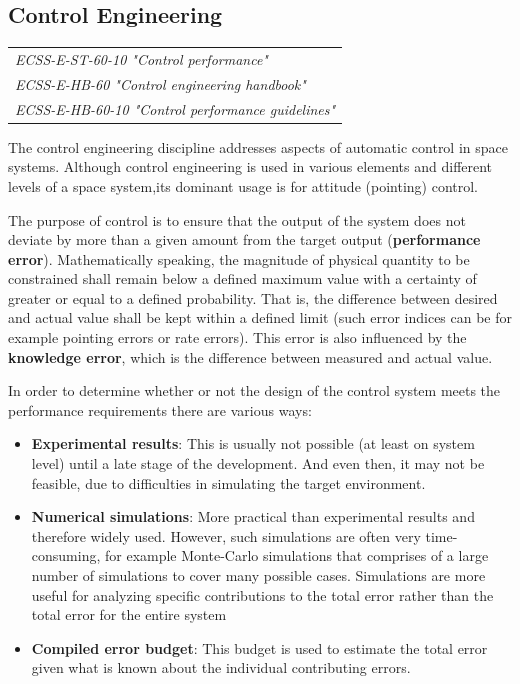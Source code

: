 \subsection{Control Engineering}

\begin{tabular}{l}
\textit{ECSS-E-ST-60-10 "Control performance" \cite{ECSS-E-ST-60-10}} \\
\textit{ECSS-E-HB-60 "Control engineering handbook" \cite{ECSS-E-HB-60}} \\
\textit{ECSS-E-HB-60-10 "Control performance guidelines" \cite{ECSS-E-HB-60-10}}
\end{tabular}

The control engineering discipline addresses aspects of automatic control in space systems. Although control engineering is used in various elements and different levels of a space system,its dominant usage is for attitude (pointing) control. 

The purpose of control is to ensure that the output of the system does not deviate by more than a given amount from the target output (\textbf{performance error}). Mathematically speaking, the magnitude of physical quantity to be constrained shall remain below a defined maximum value with a certainty of greater or equal to a defined probability. That is, the difference between desired and actual value shall be kept within a defined limit (such error indices can be for example pointing errors or rate errors). This error is also influenced by the \textbf{knowledge error}, which is the difference between measured and actual value.

In order to determine whether or not the design of the control system meets the performance requirements there are various ways:

\begin{itemize}
\item \textbf{Experimental results}: This is usually not possible (at least on system level) until a late stage of the development. And even then, it may not be feasible, due to difficulties in simulating the target environment.
\item \textbf{Numerical simulations}: More practical than experimental results and therefore widely used. However, such simulations are often very time-consuming, for example Monte-Carlo simulations that comprises of a large number of simulations to cover many possible cases. Simulations are more useful for analyzing specific contributions to the total error rather than the total error for the entire system
\item \textbf{Compiled error budget}: This budget is used to estimate the total error given what is known about the individual contributing errors.
\end{itemize}

